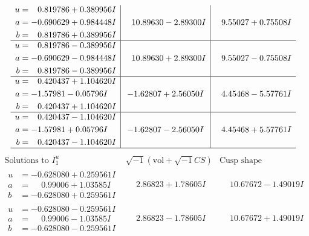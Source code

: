 \documentclass[1p]{elsarticle_modified}
\theoremstyle{definition}
\newcommand{\I}{\sqrt{-1}}
\begin{document}
$$\begin{array}{c|c|c}
\begin{aligned}
u &= \phantom{-}0.819786 + 0.389956 I \\
a &= -0.690629 + 0.984448 I \\
b &= \phantom{-}0.819786 + 0.389956 I\end{aligned}
 & \phantom{-}10.89630 - 2.89300 I & \phantom{-}9.55027 + 0.75508 I \\ \hline\begin{aligned}
u &= \phantom{-}0.819786 - 0.389956 I \\
a &= -0.690629 - 0.984448 I \\
b &= \phantom{-}0.819786 - 0.389956 I\end{aligned}
 & \phantom{-}10.89630 + 2.89300 I & \phantom{-}9.55027 - 0.75508 I \\ \hline\begin{aligned}
u &= \phantom{-}0.420437 + 1.104620 I \\
a &= -1.57981 - 0.05796 I \\
b &= \phantom{-}0.420437 + 1.104620 I\end{aligned}
 & -1.62807 + 2.56050 I & \phantom{-}4.45468 - 5.57761 I \\ \hline\begin{aligned}
u &= \phantom{-}0.420437 - 1.104620 I \\
a &= -1.57981 + 0.05796 I \\
b &= \phantom{-}0.420437 - 1.104620 I\end{aligned}
 & -1.62807 - 2.56050 I & \phantom{-}4.45468 + 5.57761 I\\
 \hline 
 \end{array}$$\newpage$$\begin{array}{c|c|c}  
\text{Solutions to }I^u_{1}& \I (\text{vol} + \sqrt{-1}CS) & \text{Cusp shape}\\
 \hline 
\begin{aligned}
u &= -0.628080 + 0.259561 I \\
a &= \phantom{-}0.99006 + 1.03585 I \\
b &= -0.628080 + 0.259561 I\end{aligned}
 & \phantom{-}2.86823 + 1.78605 I & \phantom{-}10.67672 - 1.49019 I \\ \hline\begin{aligned}
u &= -0.628080 - 0.259561 I \\
a &= \phantom{-}0.99006 - 1.03585 I \\
b &= -0.628080 - 0.259561 I\end{aligned}
 & \phantom{-}2.86823 - 1.78605 I & \phantom{-}10.67672 + 1.49019 I \\ \hline\begin{aligned}

\end{aligned}
\end{array}$$
\end{document}
